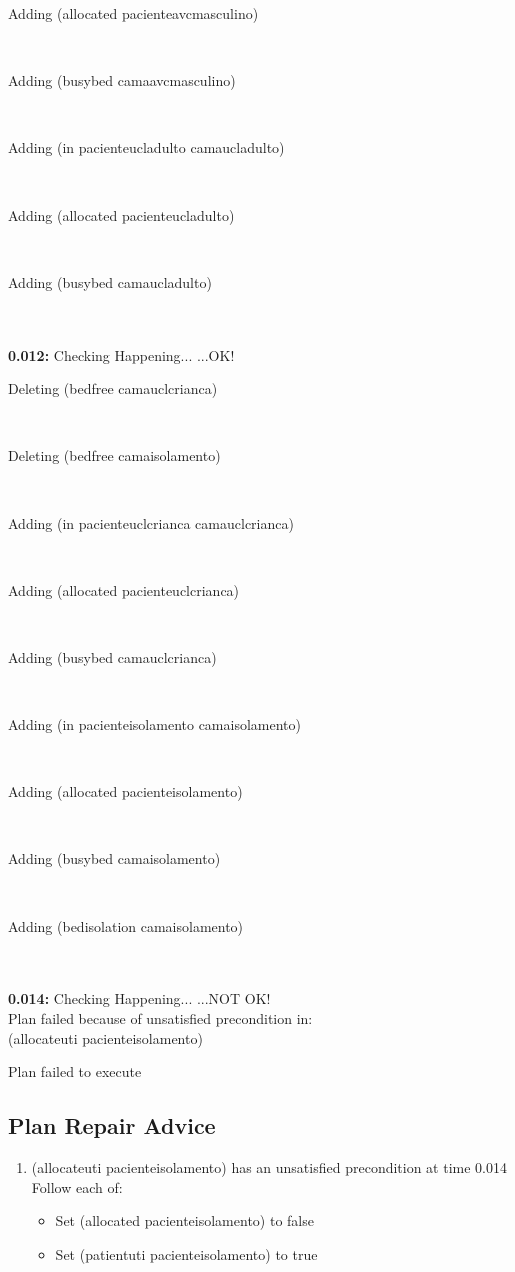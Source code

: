 \documentclass[a4paper,12pt]{article}
\newcommand{\atime}[1]{{\bf #1:}}
\newcommand{\action}[1]{{\sf #1}}
\newcommand{\exprn}[1]{{\sf #1}}
\newcommand{\checkhappening}{Checking Happening... }
\newcommand{\listrow}[1]{\begin{minipage}[t]{11.5cm} #1 \end{minipage}}
\newcommand{\happeningOK}{...OK!}
\newcommand{\notOK}{...NOT OK!}
\newcommand{\adding}[1]{\listrow{Adding \exprn{#1} }}
\newcommand{\deleting}[1]{\listrow{Deleting \exprn{#1} }}
\begin{document}
\begin{tabbing}
 \> \adding{(allocated pacienteavcmasculino)}\\
 \> \adding{(busybed camaavcmasculino)}\\
 \> \adding{(in pacienteucladulto camaucladulto)}\\
 \> \adding{(allocated pacienteucladulto)}\\
 \> \adding{(busybed camaucladulto)}\\
\\
\atime{0.012} \> \checkhappening\happeningOK\\
 \> \deleting{(bedfree camauclcrianca)}\\
 \> \deleting{(bedfree camaisolamento)}\\
 \> \adding{(in pacienteuclcrianca camauclcrianca)}\\
 \> \adding{(allocated pacienteuclcrianca)}\\
 \> \adding{(busybed camauclcrianca)}\\
 \> \adding{(in pacienteisolamento camaisolamento)}\\
 \> \adding{(allocated pacienteisolamento)}\\
 \> \adding{(busybed camaisolamento)}\\
 \> \adding{(bedisolation camaisolamento)}\\
\\
\atime{0.014} \> \checkhappening \notOK \\
 \> Plan failed because of unsatisfied precondition in:\\
 \> \action{(allocateuti pacienteisolamento)}\\
\end{tabbing}

Plan failed to execute
\subsection{Plan Repair Advice}
\begin{enumerate}
\item \action{(allocateuti pacienteisolamento)} has an unsatisfied precondition at time 0.014\\
Follow each of:
\begin{itemize}\item Set \exprn{(allocated pacienteisolamento)} to false
\item Set \exprn{(patientuti pacienteisolamento)} to true
\end{itemize}\end{enumerate}
\end{document}
